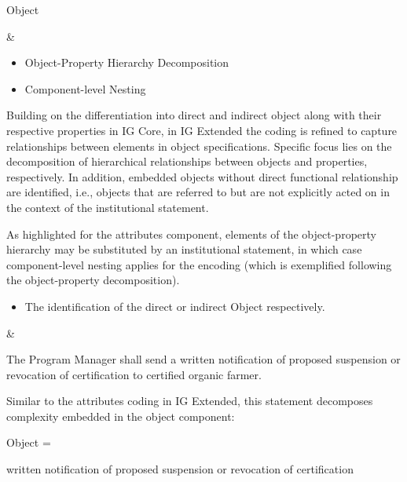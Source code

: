 \begin{landscape}
\begin{longtable}{\tabledims}
\midrule

\begin{emp}Object\end{emp} &

\begin{itemize}
\item Object-Property Hierarchy Decomposition
\item Component-level Nesting
\end{itemize}

Building on the differentiation into direct and indirect object along with their respective properties in IG Core, in IG Extended the coding is refined to capture relationships between elements in object specifications. Specific focus lies on the decomposition of hierarchical relationships between objects and properties, respectively. 
In addition, embedded objects without direct functional relationship are identified, i.e., objects that are referred to but are not explicitly acted on in the context of the institutional statement.

As highlighted for the attributes component, elements of the object-property hierarchy may be substituted by an institutional statement, in which case component-level nesting applies for the encoding (which is exemplified following the object-property decomposition).

\sp


\begin{itemize}
    \item The identification of the direct or indirect Object respectively.
\end{itemize}
    

&



\begin{exi}The Program Manager shall send a written notification of proposed suspension or revocation of certification to certified organic farmer.\end{exi}

\sp

Similar to the attributes coding in IG Extended, this statement decomposes complexity embedded in the object component:

\sp

Object = \begin{exi}written notification of proposed suspension or revocation of certification\end{exi}


\end{longtable}
\end{landscape}
